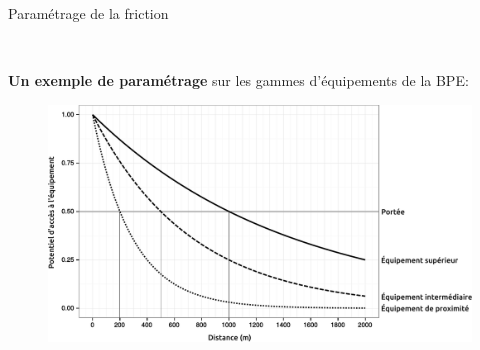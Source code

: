 \begin{frame}{Paramétrage de la friction}

~

\textbf{Un exemple de paramétrage} sur les gammes d'équipements de la BPE:

\begin{figure}
  \includegraphics[width=12cm]{ProbaFreq.pdf}
\end{figure}

\end{frame}


